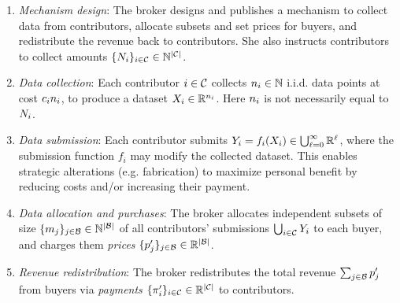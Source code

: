 \begin{enumerate} [leftmargin=0.2in]
    \item \emph{Mechanism design}:
    \label{itm:mechanismdesign}
    The broker designs and publishes a mechanism  to collect data from
contributors, allocate subsets and set prices for buyers, and redistribute the revenue back to contributors.
She also instructs contributors to
collect amounts $\{N_i\}_{i\in\mathcal{C}}\in\mathbb{N}^{|\mathcal{C}|}$.
    \item \emph{Data collection}:
    \label{itm:datacollection}
Each contributor $i \in \mathcal{C}$ collects $n_i \in \mathbb{N}$ i.i.d. data points at cost $c_i n_i$, to produce a dataset $X_{i} \in \mathbb{R}^{n_i}$.
Here $n_i$ is not necessarily equal to $N_i$.
    \item \emph{Data submission}:
    \label{itm:datasubmission}
    Each contributor submits $Y_{i} = f_i(X_{i}) \in \bigcup_{\ell=0}^\infty \mathbb{R}^\ell$, where the submission function $f_i$ may modify the collected dataset. This enables strategic
alterations (e.g. fabrication) to maximize personal benefit by reducing costs and/or
increasing their payment. \hspace{-0.5in}

    \item \emph{Data allocation and purchases}:
    \label{itm:pricing}
     The broker allocates independent subsets of size
     $\{m_j\}_{j\in\mathcal{B}} \in \mathbb{N}^{|\mathcal{B}|}$ of
     all contributors' submissions $\bigcup_{i\in\mathcal{C}}Y_{i}$
     to each buyer, and charges them \emph{prices} $\{p_j'\}_{j \in \mathcal{B}}\in\mathbb{R}^{|\mathcal{B}|}$.
    

    \item \emph{Revenue redistribution}: \hspace{-0.05in}
    \label{itm:revenueredistribution}
    The broker redistributes the total revenue $\sum_{j \in \mathcal{B}} p_j'$ from buyers via \emph{payments} $\{\pi_i'\}_{i \in \mathcal{C}} \in \mathbb{R}^{|\mathcal{C}|}$  to contributors.
\end{enumerate}




